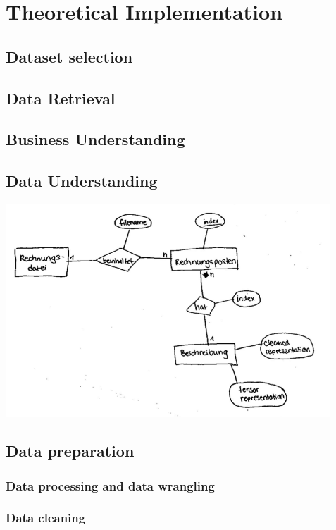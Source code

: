 \chapter{Theoretical Implementation}

\section{Dataset selection}

\section{Data Retrieval}

\section{Business Understanding}

\section{Data Understanding}

	\includegraphics[height=8cm]{Bilder/data_model.png}

\section{Data preparation}

\subsection{Data processing and data wrangling}


\subsection{Data cleaning}



